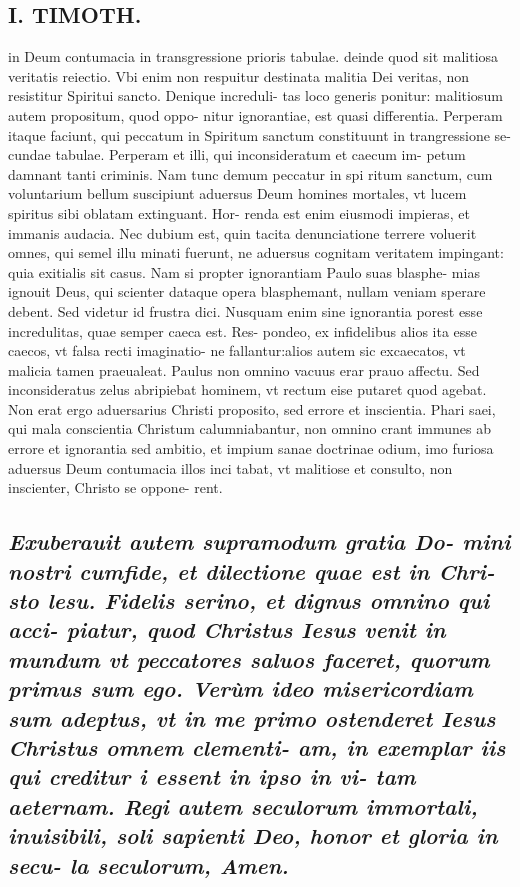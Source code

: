 \documentclass{article}
\begin{document}
\begin{pages}
\section*{I. TIMOTH. }
\marginpar{[ p.10 ]}\pstart in Deum contumacia in transgressione prioris tabulae. deinde quod sit malitiosa veritatis reiectio. Vbi enim non respuitur destinata malitia Dei veritas, non resistitur Spiritui sancto. Denique increduli- tas loco generis ponitur: malitiosum autem propositum, quod oppo- nitur ignorantiae, est quasi differentia. Perperam itaque faciunt, qui peccatum in Spiritum sanctum constituunt in trangressione se- cundae tabulae. Perperam et illi, qui inconsideratum et caecum im- petum damnant tanti criminis. Nam tunc demum peccatur in spi ritum sanctum, cum voluntarium bellum suscipiunt aduersus Deum homines mortales, vt lucem spiritus sibi oblatam extinguant. Hor- renda est enim eiusmodi impieras, et immanis audacia. Nec dubium est, quin tacita denunciatione terrere voluerit omnes, qui semel illu minati fuerunt, ne aduersus cognitam veritatem impingant: quia exitialis sit casus. Nam si propter ignorantiam Paulo suas blasphe- mias ignouit Deus, qui scienter dataque opera blasphemant, nullam veniam sperare debent. Sed videtur id frustra dici. Nusquam enim sine ignorantia porest esse incredulitas, quae semper caeca est. Res- pondeo, ex infidelibus alios ita esse caecos, vt falsa recti imaginatio- ne fallantur:alios autem sic excaecatos, vt malicia tamen praeualeat. Paulus non omnino vacuus erar prauo affectu. Sed inconsideratus zelus abripiebat hominem, vt rectum eise putaret quod agebat. Non erat ergo aduersarius Christi proposito, sed errore et inscientia. Phari saei, qui mala conscientia Christum calumniabantur, non omnino crant immunes ab errore et ignorantia sed ambitio, et impium sanae doctrinae odium, imo furiosa aduersus Deum contumacia illos inci tabat, vt malitiose et consulto, non inscienter, Christo se oppone- rent.  \pend
{}
{}
\subsection*{\textit{Exuberauit autem supramodum gratia Do- mini nostri cumfide, et dilectione quae est in Chri- sto lesu. Fidelis serino, et dignus omnino qui acci- piatur, quod Christus Iesus venit in mundum vt peccatores saluos faceret, quorum primus sum ego. Verùm ideo misericordiam sum adeptus, vt in me primo ostenderet Iesus Christus omnem clementi- am, in exemplar iis qui creditur i essent in ipso in vi- tam aeternam. Regi autem seculorum immortali, inuisibili, soli sapienti Deo, honor et gloria in secu- la seculorum, Amen. }}

\end{pages}
\end{document}
